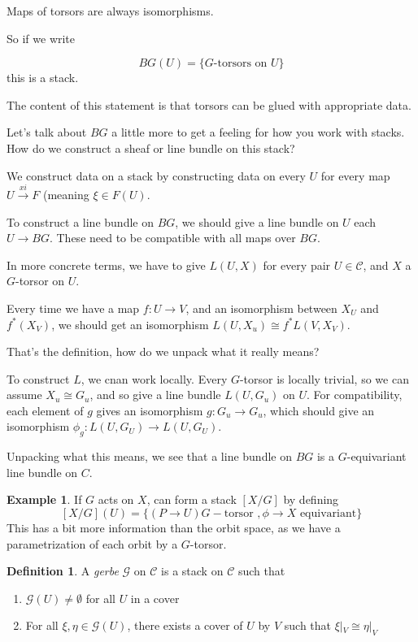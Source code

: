 \documentclass{amsart}
\theoremstyle{definition}
\newtheorem{definition}[dummy]{Definition}
\newtheorem{example}[dummy]{Example}
\begin{document}
Maps of torsors are always isomorphisms.

So if we write

$$BG(U)=\{\text{$G$-torsors on $U$}\}$$
this is a stack.

The content of this statement is that torsors can be glued with appropriate data.

Let's talk about $BG$ a little more to get a feeling for how you work with stacks.  How do we construct a sheaf or line bundle on this stack?

We construct data on a stack by constructing data on every $U$ for every map $U\stackrel{xi}\to F$ (meaning $\xi\in F(U)$.

To construct a line bundle on $BG$, we should give a line bundle on $U$ each $U\to BG$.  These need to be compatible with all maps over $BG$.  

In more concrete terms, we have to give $L(U,X)$ for every pair $U\in \mathcal{C}$, and $X$ a $G$-torsor on $U$.

Every time we have a map $f:U\to V$, and an isomorphism between $X_U$ and $f^*(X_V)$, we should get an isomorphism $L(U,X_u)\cong f^* L(V,X_V)$.

That's the definition, how do we unpack what it really means?

To construct $L$, we cnan work locally.  Every $G$-torsor is locally trivial, so we can assume $X_u\cong G_u$, and so give a line bundle $L(U, G_u)$ on $U$.  For compatibility, each element of $g$ gives an isomorphism $g:G_u\to G_u$, which should give an isomorphism $\phi_g:L(U,G_U)\to L(U, G_U)$.

Unpacking what this means, we see that a line bundle on $BG$ is a $G$-equivariant line bundle on $C$.


\begin{example}
If $G$ acts on $X$, can form a stack $[X/G]$ by defining
$$[X/G](U)=\{(P\to U) G-\text{torsor }, \phi\to X \text{ equivariant}\}$$
This has a bit more information than the orbit space, as we have a parametrization of each orbit by a $G$-torsor.
\end{example}


\begin{definition}
A \emph{gerbe} $\mathcal{G}$ on $\mathcal{C}$ is a stack on $\mathcal{C}$ such that
\begin{enumerate}
\item $\mathcal{G}(U)\neq\emptyset$ for all $U$ in a cover
\item For all $\xi, \eta\in\mathcal{G}(U)$, there exists a cover of $U$ by $V$ such that $\xi|_V\cong \eta|_V$
\end{enumerate}

\end{definition}
\end{document}
